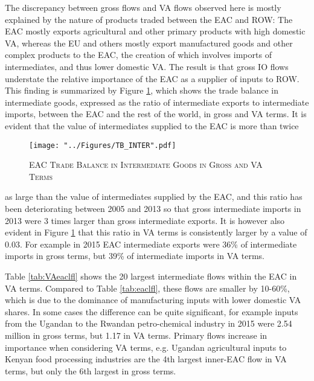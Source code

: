 \documentclass[a4paper]{article}
\begin{document}
The discrepancy between gross flows and VA flows observed here is mostly explained by the nature of products traded between the EAC and ROW: The EAC mostly exports agricultural and other primary products with high domestic VA, whereas the EU and others mostly export manufactured goods and other complex products to the EAC, the creation of which involves imports of intermediates, and thus lower domestic VA. The result is that gross IO flows understate the relative importance of the EAC as a supplier of inputs to ROW. This finding is summarized by Figure \ref{fig:TBint}, which shows the trade balance in intermediate goods, expressed as the ratio of intermediate exports to intermediate imports, between the EAC and the rest of the world, in gross and VA terms. It is evident that the value of intermediates supplied to the EAC is more than twice

\begin{figure}[h!]
\centering
\caption{\label{fig:TBint}\textsc{EAC Trade Balance in Intermediate Goods in Gross and VA Terms}}
\texttt{[image: "../Figures/TB\_INTER".pdf]} %
\end{figure}
\FloatBarrier

\noindent as large than the value of intermediates supplied by the EAC, and this ratio has been deteriorating between 2005 and 2013 so that gross intermediate imports in 2013 were 3 times larger than gross intermediate exports. It is however also evident in Figure \ref{fig:TBint} that this ratio in VA terms is consistently larger by a value of 0.03. For example in 2015 EAC intermediate exports were 36\% of intermediate imports in gross terms, but 39\% of intermediate imports in VA terms. \newline

Table \ref{tab:VAeaclfl} shows the 20 largest intermediate flows within the EAC in VA terms. Compared to Table \ref{tab:eaclfl}, these flows are smaller by 10-60\%, which is due to the dominance of manufacturing inputs with lower domestic VA shares. In some cases the difference can be quite significant, for example inputs from the Ugandan to the Rwandan petro-chemical industry in 2015 were 2.54 million in gross terms, but 1.17 in VA terms. Primary flows increase in importance when considering VA terms, e.g. Ugandan agricultural inputs to Kenyan food processing industries are the 4th largest inner-EAC flow in VA terms, but only the 6th largest in gross terms. 
\end{document}
